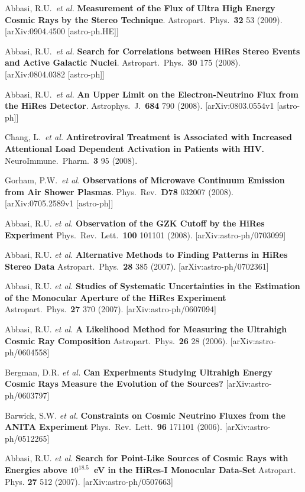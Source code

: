 \begin{resume}
Abbasi, R.U.\ {\it et al.} {\bf Measurement of the Flux of Ultra High Energy Cosmic Rays by the Stereo Technique}.  Astropart.\ Phys.\ {\bf 32} 53 (2009). [arXiv:0904.4500 [astro-ph.HE]]

Abbasi, R.U.\ {\it et al.} {\bf Search for Correlations between HiRes Stereo Events and Active Galactic Nuclei}. Astropart.\ Phys.\ {\bf 30} 175 (2008).
[arXiv:0804.0382 [astro-ph]]

Abbasi, R.U.\ {\it et al.} {\bf An Upper Limit on the Electron-Neutrino Flux
from the HiRes Detector}. Astrophys.\ J.\ {\bf 684} 790 (2008).
[arXiv:0803.0554v1 [astro-ph]]

Chang, L.\ {\it et al.} {\bf Antiretroviral Treatment is Associated with
Increased Attentional Load Dependent Activation in Patients with HIV.} NeuroImmune.\ Pharm.\ {\bf 3} 95 (2008).

Gorham, P.W.\ {\it et al.} {\bf Observations of Microwave Continuum Emission
from Air Shower Plasmas}. Phys.\ Rev.\ {\bf D78} 032007 (2008).
[arXiv:0705.2589v1 [astro-ph]]

Abbasi, R.U. {\it et al.} {\bf Observation of the GZK Cutoff by the HiRes
Experiment} Phys.\ Rev.\ Lett.\ {\bf 100} 101101 (2008).
[arXiv:astro-ph/0703099]

Abbasi, R.U. {\it et al.} {\bf Alternative Methods to Finding Patterns in
HiRes Stereo Data} Astropart.\ Phys.\ {\bf 28} 385 (2007).
[arXiv:astro-ph/0702361]

Abbasi, R.U. {\it et al.} {\bf Studies of Systematic Uncertainties in the
Estimation of the Monocular Aperture of the HiRes Experiment} Astropart.\
Phys.\ {\bf 27} 370 (2007).
[arXiv:astro-ph/0607094]

Abbasi, R.U. {\it et al.} {\bf A Likelihood Method for Measuring the
Ultrahigh Cosmic Ray Composition} Astropart.\ Phys.\ {\bf 26} 28 (2006).
[arXiv:astro-ph/0604558]

Bergman, D.R. {\it et al.}  {\bf Can Experiments Studying Ultrahigh Energy
Cosmic Rays Measure the Evolution of the Sources?} [arXiv:astro-ph/0603797]

Barwick, S.W. {\it et al.}  {\bf Constraints on Cosmic Neutrino Fluxes from the
ANITA Experiment} Phys.\ Rev.\ Lett.\ {\bf 96} 171101 (2006).
[arXiv:astro-ph/0512265]

Abbasi, R.U. {\it et al.}  {\bf Search for Point-Like Sources of Cosmic Rays
with Energies above \boldmath$10^{18.5}$~eV in the HiRes-I Monocular Data-Set}
Astropart. Phys. {\bf 27} 512 (2007).
[arXiv:astro-ph/0507663]


\end{resume}
